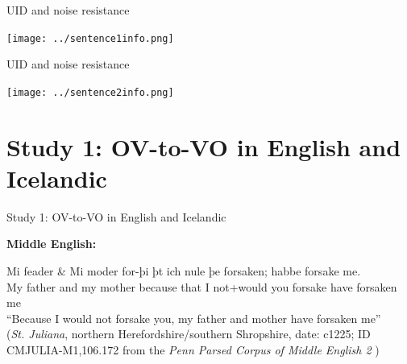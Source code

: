 \documentclass[hyperref={pdfpagelabels=false}]{beamer}
\begin{document}
\begin{frame}{UID and noise resistance} 

\begin{center}
\texttt{[image: ../sentence1info.png]} 
\end{center}

\end{frame}

\begin{frame}{UID and noise resistance} 

\begin{center}
	\texttt{[image: ../sentence2info.png]} 
\end{center}

\end{frame}


\section{Study 1: OV-to-VO in English and Icelandic}

\begin{frame}{Study 1: OV-to-VO in English and Icelandic} 
	

	\textbf{Middle English:}
	\begin{exe}	
		\ex \label{julia}  \gll Mi feader \& Mi moder for-þi þt ich nule þe forsaken; habbe forsake me.\\
		My father and my mother because that I not+would you forsake have forsaken me\\
		\quad ``Because I would not forsake you, my father and mother have forsaken me''\\\vspace{2mm}
		\small{(\textsl{St. Juliana}, northern Herefordshire/southern Shropshire, date: c1225; ID CMJULIA-M1,106.172 from the \textsl{Penn Parsed Corpus of Middle English 2} \citep{ppcme24})}
	\end{exe}
	
\end{frame}
\end{document}
